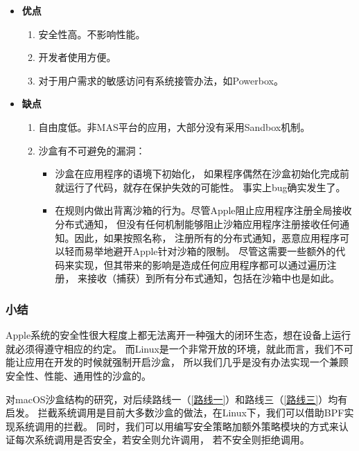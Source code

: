 \documentclass[AutoFakeBold,a4paper]{ctexart}
\begin{document}
\begin{itemize}
    \item \textbf{优点}
    \begin{enumerate}
        \item 安全性高。不影响性能。
        \item 开发者使用方便。
        \item 对于用户需求的敏感访问有系统接管办法，如Powerbox。
    \end{enumerate}
    \item \textbf{缺点}
    \begin{enumerate}
        \item 自由度低。非MAS平台的应用，大部分没有采用Sandbox机制。
        \item 沙盒有不可避免的漏洞：
        \begin{itemize}
            \item 沙盒在应用程序的语境下初始化，
            如果程序偶然在沙盒初始化完成前就运行了代码，就存在保护失效的可能性。 
            事实上bug确实发生了。\cite{blochberger2019state}
            \item 在规则内做出背离沙箱的行为。\cite{Mojave2018}尽管Apple阻止应用程序注册全局接收分布式通知，
            但没有任何机制能够阻止沙箱应用程序注册接收任何通知。因此，如果按照名称，
            注册所有的分布式通知，恶意应用程序可以轻而易举地避开Apple针对沙箱的限制。
            尽管这需要一些额外的代码来实现，但其带来的影响是造成任何应用程序都可以通过遍历注册，
            来接收（捕获）到所有分布式通知，包括在沙箱中也是如此。
        \end{itemize}
    \end{enumerate}
\end{itemize}

\subsubsection{小结}

Apple系统的安全性很大程度上都无法离开一种强大的闭环生态，想在设备上运行就必须得遵守相应的约定。
而Linux是一个非常开放的环境，就此而言，我们不可能让应用在开发的时候就强制开启沙盒，
所以我们几乎是没有办法实现一个兼顾安全性、性能、通用性的沙盒的。

对macOS沙盒结构的研究，对后续路线一（\ref{路线一}）和路线三（\ref{路线三}）均有启发。
拦截系统调用是目前大多数沙盒的做法，在Linux下，我们可以借助BPF实现系统调用的拦截。
同时，我们可以用编写安全策略加额外策略模块的方式来认证每次系统调用是否安全，若安全则允许调用，
若不安全则拒绝调用。
\end{document}
